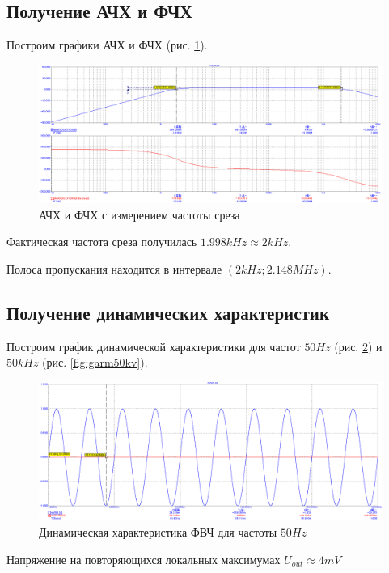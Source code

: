 \documentclass[a4paper,14pt]{article}
\begin{document}
\subsection{Получение АЧХ и ФЧХ}

Построим графики АЧХ и ФЧХ (рис. \ref{fig:afchv1}).

\begin{figure}[H]
	\centering
	\includegraphics[width=0.85\linewidth]{../imgs/FVCH/AFcH_V1}
	\caption{АЧХ и ФЧХ с измерением частоты среза}
	\label{fig:afchv1}
\end{figure}


Фактическая частота среза получилась $1.998kHz \approx 2kHz$.

Полоса пропускания находится в интервале $(2kHz; 2.148MHz)$.


\subsection{Получение динамических характеристик}

Построим график динамической характеристики для частот $50Hz$ (рис. \ref{fig:garm50v}) и $50kHz$ (рис. \ref{fig:garm50kv}).

\begin{figure}[H]
	\centering
	\includegraphics[width=0.95\linewidth]{../imgs/FVCH/garm_50_V}
	\caption{Динамическая характеристика ФВЧ для частоты $50Hz$}
	\label{fig:garm50v}
\end{figure}


Напряжение на повторяющихся локальных максимумах $U_{out} \approx 4mV$
\end{document}
